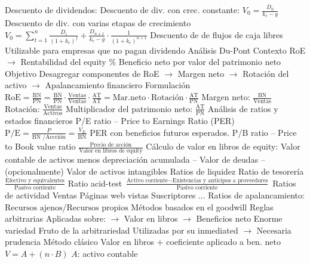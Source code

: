 \documentclass{nuevotema}
\begin{document}
\begin{esquemal}
				\4 Descuento de dividendos:
				\4[] 
				\4 Descuento de div. con crec. constante:
				\4[] $V_0 = \frac{D_0}{k_e-g}$
				\4 Descuento de div. con varias etapas de crecimiento
				\4[] $V_0 = \sum_{t=1}^{n} \frac{D_i}{(1+k_e)^f} + \frac{D_{n+1}}{k_e -g} \cdot \frac{1}{(1+k_e)^{n+1}}$
				\4 Descuento de de flujos de caja libres
				\4[] Utilizable para empresas que no pagan dividendo
			\3 Análisis Du-Pont
				\4 Contexto
				\4[] RoE
				\4[] $\to$ Rentabilidad del equity
				\4[] \% Beneficio neto por valor del patrimonio neto
				\4 Objetivo
				\4[] Desagregar componentes de RoE
				\4[] $\to$ Margen neto
				\4[] $\to$ Rotación del activo
				\4[] $\to$ Apalancamiento financiero
				\4 Formulación
				\4[] $\text{RoE} = \frac{\text{BN}}{\text{PN}} = \frac{\text{BN}}{\text{PN}} \cdot \frac{\text{Ventas}}{\text{Ventas}} \cdot \frac{\text{AT}}{\text{AT}} = \text{Mar.neto} \cdot \text{Rotación} \cdot \frac{\text{AT}}{\text{PN}} $
				\4[] Margen neto: $\frac{\text{BN}}{\text{Ventas}}$
				\4[] Rotación: $\frac{\text{Ventas}}{\text{Activos}}$
				\4[] Multiplicador del patrimonio neto: $\frac{\text{AT}}{\text{PN}}$
			\3 Análisis de ratios y estados financieros
				\4 P/E ratio -- Price to Earnings Ratio (PER)
				\4[] $\textrm{P/E}=\frac{P}{\textrm{BN /Accción}} = \frac{V_E}{\text{BN}}$
				\4[] PER con beneficios futuros esperados.
				\4 P/B ratio -- Price to Book value ratio
				\4[] $\frac{\text{Precio de acción}}{\text{Valor en libros de equity}}$
				\4[] Cálculo de valor en libros de equity:
				\4[] Valor contable de activos menos depreciación acumulada
				\4[] -- Valor de deudas
				\4[] -- (opcionalmente) Valor de activos intangibles
				\4 Ratios de liquidez
				\4[] Ratio de tesorería
				\4[] $\frac{\text{Efectivo y equivalentes}}{\text{Pasivo corriente}}$
				\4[] Ratio acid-test
				\4[] $\frac{\text{Activo corriente}-\text{Existencias y anticipos a proveedores} }{\text{Pasivo corriente}}$
				\4 Ratios de actividad
				\4[] Ventas
				\4[] Páginas web vistas
				\4[] Suscriptores
				\4[] ...
				\4 Ratios de apalancamiento:
				\4[] $\textrm{Recursos ajenos} / \textrm{Recursos propios}$
			\3 Métodos basados en el goodwill
				\4 Reglas arbitrarias
				\4[] Aplicadas sobre:
				\4[] $\to$ Valor en libros
				\4[] $\to$ Beneficios neto
				\4 Enorme variedad
				\4[] Fruto de la arbitrariedad
				\4[] Utilizadas por su inmediated
				\4[] $\to$ Necesaria prudencia
				\4 Método clásico
				\4[] Valor en libros + coeficiente aplicado a ben. neto
				\4[] $V = A + (n\cdot B)$
				\4[] $A$: activo contable

\end{esquemal}
\end{document}

